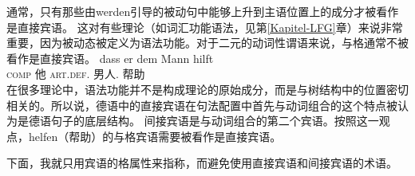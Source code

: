 通常，只有那些由werden引导的被动句中能够上升到主语位置上的成分才被看作是直接宾语。
这对有些理论（如词汇功能语法\indexlfg，见第\ref{Kapitel-LFG}章）来说非常重要，因为被动态被定义为语法功能。对于二元的动词性谓语来说，与格通常不被看作是直接宾语\citep{Cook2006a-u}。
\ea
\gll dass er dem Mann hilft\\
     \textsc{comp} 他 \textsc{art}.\textsc{def}.\dat{} 男人.\dat{} 帮助\\
\z
在很多理论中，语法功能并不是构成理论的原始成分，而是与树结构中的位置密切相关的。所以说，德语中的直接宾语在句法配置中首先与动词组合的这个特点被认为是德语句子的底层结构。
间接宾语是与动词组合的第二个宾语。按照这一观点，helfen（帮助）的与格宾语需要被看作是直接宾语。

下面，我就只用宾语的格属性来指称，而避免使用直接宾语和间接宾语的术语。

